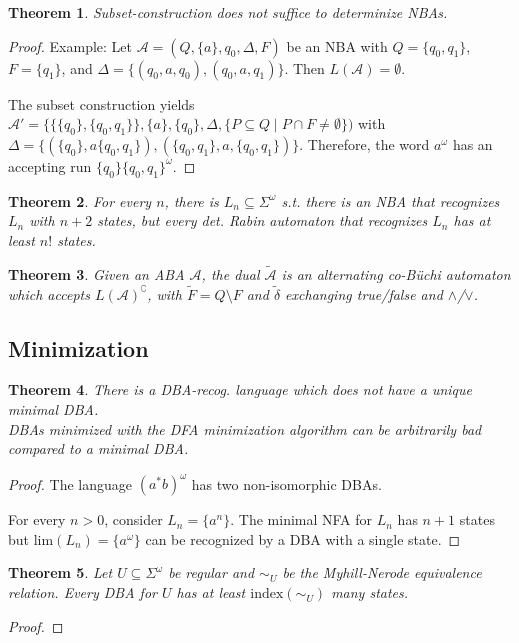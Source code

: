 \documentclass{article}
\newtheorem{theorem}{Theorem}[section]
\begin{document}
\begin{theorem}
	Subset-construction does not suffice to determinize NBAs.
\end{theorem}
\begin{proof}
	Example: Let $\mathcal{A} = (Q, \{a\}, q_0, \Delta, F)$ be an NBA with $Q = \{q_0, q_1\}$, $F = \{q_1\}$, and $\Delta = \{(q_0, a, q_0), (q_0, a, q_1)\}$. Then $L(\mathcal{A}) = \emptyset$.
	
	The subset construction yields $\mathcal{A}' = \{ \{ \{q_0\}, \{q_0, q_1\} \}, \{a\}, \{q_0\}, \Delta, \{ P \subseteq Q \mid P \cap F \neq \emptyset\})$ with $\Delta = \{ (\{q_0\}, a \{q_0, q_1\}), (\{ q_0, q_1 \}, a, \{ q_0, q_1\} ) \}$. Therefore, the word $a^\omega$ has an accepting run $\{q_0\} \{q_0, q_1\}^\omega$.
\end{proof}

\begin{theorem}
	For every $n$, there is $L_n \subseteq \Sigma^\omega$ s.t. there is an NBA that recognizes $L_n$ with $n+2$ states, but every det. Rabin automaton that recognizes $L_n$ has at least $n!$ states.
\end{theorem}

\begin{theorem}
	Given an ABA $\mathcal{A}$, the dual $\tilde{\mathcal{A}}$ is an alternating co-Büchi automaton which accepts $L(\mathcal{A})^\complement$, with $\tilde{F} = Q \setminus F$ and $\tilde{\delta}$ exchanging true/false and $\land$/$\lor$.
\end{theorem}


\subsection{Minimization}
\begin{theorem}
	There is a DBA-recog. language which does not have a unique minimal DBA. \\
	DBAs minimized with the DFA minimization algorithm can be arbitrarily bad compared to a minimal DBA.
\end{theorem}
\begin{proof}
	The language $(a^* b)^\omega$ has two non-isomorphic DBAs.
	
	For every $n>0$, consider $L_n = \{a^n\}$. The minimal NFA for $L_n$ has $n+1$ states but $\text{lim}(L_n) = \{a^\omega\}$ can be recognized by a DBA with a single state.
\end{proof}


\begin{theorem}
	Let $U \subseteq \Sigma^\omega$ be regular and $\sim_U$ be the Myhill-Nerode equivalence relation. Every DBA for $U$ has at least $\text{index}(\sim_U)$ many states.
\end{theorem}
\begin{proof}
\end{proof}
\end{document}

